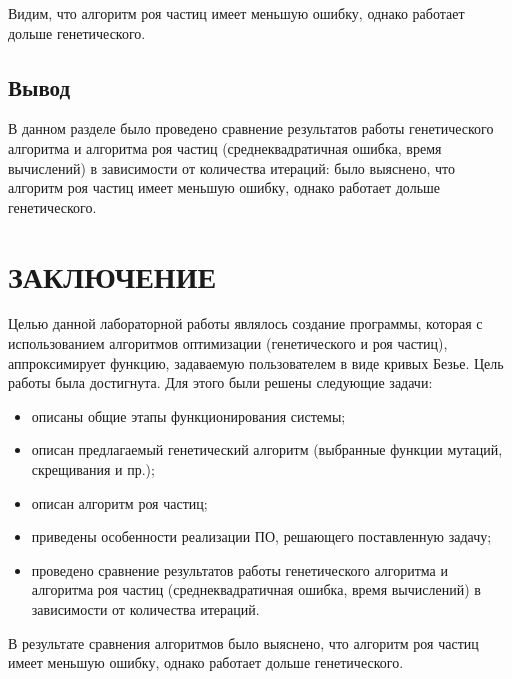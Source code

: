 \documentclass[12pt]{report}
\begin{document}
Видим, что алгоритм роя частиц имеет меньшую ошибку, однако работает дольше генетического. 

\section*{Вывод}
В данном разделе было проведено сравнение результатов работы генетического алгоритма и алгоритма роя частиц (среднеквадратичная ошибка, время вычислений) в зависимости от количества итераций: было выяснено, что алгоритм роя частиц имеет меньшую ошибку, однако работает дольше генетического.

\chapter*{ЗАКЛЮЧЕНИЕ}
Целью данной лабораторной работы являлось создание программы, которая с использованием алгоритмов оптимизации (генетического и роя частиц), аппроксимирует функцию, задаваемую пользователем в виде кривых Безье. 
Цель работы была достигнута.
Для этого были решены следующие задачи:
\begin{itemize}
    \item описаны общие этапы функционирования системы;
    \item описан предлагаемый генетический алгоритм (выбранные функции мутаций, скрещивания и пр.);
    \item описан алгоритм роя частиц;
    \item приведены особенности реализации ПО, решающего поставленную задачу;
    \item проведено сравнение результатов работы генетического алгоритма и алгоритма роя частиц (среднеквадратичная ошибка, время вычислений) в зависимости от количества итераций.
\end{itemize}

В результате сравнения алгоритмов было выяснено, что алгоритм роя частиц имеет меньшую ошибку, однако работает дольше генетического.

\printbibliography[title={СПИСОК ИСПОЛЬЗОВАННЫХ\\ ИСТОЧНИКОВ}]
\end{document}
